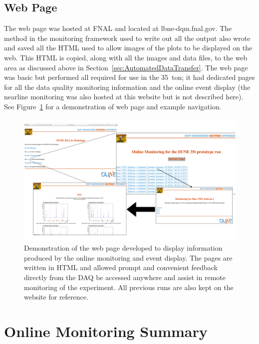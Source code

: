 \subsection{Web Page}\label{sec:WebPage}

The web page was hosted at FNAL and located at lbne-dqm.fnal.gov.  The method in the monitoring framework used to write out all the output also wrote and saved all the HTML used to allow images of the plots to be displayed on the web.  This HTML is copied, along with all the images and data files, to the web area as discussed above in Section~\ref{sec:AutomatedDataTransfer}.  The web page was basic but performed all required for use in the 35~ton; it had dedicated pages for all the data quality monitoring information and the online event display (the nearline monitoring was also hosted at this website but is not described here).  See Figure~\ref{fig:WebPage} for a demonstration of web page and example navigation.

\begin{figure}[ht]
  \centering
  \includegraphics[width=14cm]{webPage.png}
  \caption[Web page for online monitoring and event displays]{Demonstration of the web page developed to display information produced by the online monitoring and event display.  The pages are written in HTML and allowed prompt and convenient feedback directly from the DAQ be accessed anywhere and assist in remote monitoring of the experiment.  All previous runs are also kept on the website for reference.}
  \label{fig:WebPage}
\end{figure}

\section{Online Monitoring Summary}

